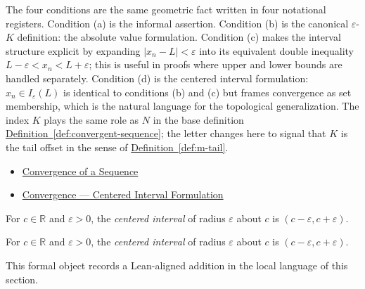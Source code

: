 \begin{remark*}[Interpretation]
The four conditions are the same geometric fact written in four
notational registers. Condition (a) is the informal assertion.
Condition (b) is the canonical $\varepsilon$-$K$ definition: the
absolute value formulation. Condition (c) makes the interval
structure explicit by expanding $|x_n - L| < \varepsilon$ into its
equivalent double inequality $L - \varepsilon < x_n < L +
\varepsilon$; this is useful in proofs where upper and lower bounds
are handled separately. Condition (d) is the centered interval
formulation: $x_n \in I_\varepsilon(L)$ is identical to conditions
(b) and (c) but frames convergence as set membership, which is the
natural language for the topological generalization. The index $K$
plays the same role as $N$ in the base definition
\hyperref[def:convergent-sequence]{Definition~\ref*{def:convergent-sequence}};
the letter changes here to signal that $K$ is the tail offset in
the sense of \hyperref[def:m-tail]{Definition~\ref*{def:m-tail}}.
\end{remark*}

\begin{dependencies}
\begin{itemize}
  \item \hyperref[def:convergent-sequence]{Convergence of a Sequence}
  \item \hyperref[def:convergent-sequence-neighborhood]{Convergence --- Centered Interval Formulation}
\end{itemize}
\end{dependencies}

\begin{definition}
\label{def:centered-interval}
For $c\in\mathbb R$ and $\varepsilon>0$, the \emph{centered interval} of radius $\varepsilon$ about $c$ is $(c-\varepsilon,c+\varepsilon)$.
\end{definition}

\begin{remark*}
For $c\in\mathbb R$ and $\varepsilon>0$, the \emph{centered interval} of radius $\varepsilon$ about $c$ is $(c-\varepsilon,c+\varepsilon)$.
\end{remark*}

\begin{remark*}[Interpretation]
This formal object records a Lean-aligned addition in the local language of this section.
\end{remark*}

\begin{dependencies}
\NoLocalDependencies
\end{dependencies}
